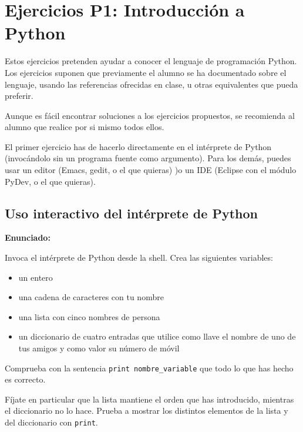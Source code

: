 \section{Ejercicios P1: Introducción a Python}

Estos ejercicios pretenden ayudar a conocer el lenguaje de programación Python. Los ejercicios suponen que previamente el alumno se ha documentado sobre el lenguaje, usando las referencias ofrecidas en clase, u otras equivalentes que pueda preferir.

Aunque es fácil encontrar soluciones a los ejercicios propuestos, se recomienda al alumno que realice por si mismo todos ellos.

El primer ejercicio has de hacerlo directamente en el intérprete de Python (invocándolo sin un  programa fuente como argumento). Para los demás, puedes usar un editor (Emacs, gedit, o el que quieras) )o un IDE (Eclipse con el módulo PyDev, o el que quieras).

\subsection{Uso interactivo del intérprete de Python}
\label{subsec:practicas-interprete}

\textbf{Enunciado:}

Invoca el intérprete de Python desde la shell. Crea las siguientes
variables:

\begin{itemize}
\item un entero
\item una cadena de caracteres con tu nombre
\item una lista con cinco nombres de persona
\item un diccionario de cuatro
entradas que utilice como llave el nombre de uno de tus amigos y como valor su
número de móvil
\end{itemize}

Comprueba con la sentencia \verb|print nombre_variable| que todo lo
que has hecho es correcto.

Fíjate en particular que la lista mantiene el
orden que has introducido, mientras el diccionario no lo hace. Prueba a mostrar 
los distintos elementos de la lista y del diccionario con \verb|print|.

